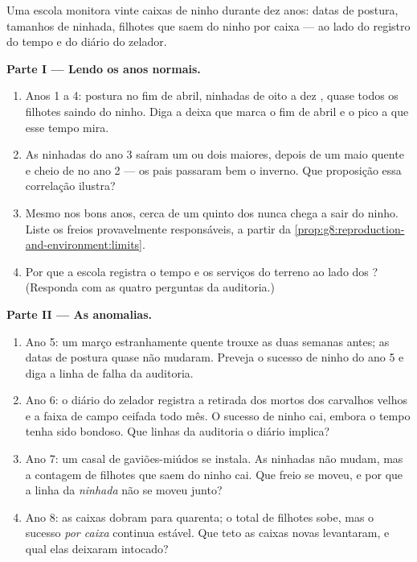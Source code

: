 \begin{problem}\label{pb:g8:reproduction-and-environment:1}
Uma escola monitora vinte caixas de ninho durante dez anos: datas de
postura, tamanhos de ninhada, filhotes que saem do ninho por caixa ---
ao lado do registro do tempo e do diário do zelador.

\medskip\noindent\textbf{Parte I --- Lendo os anos
normais.}
\begin{enumerate}
  \item Anos 1 a 4: postura no fim de abril, ninhadas de oito a dez
        , quase todos os filhotes saindo do ninho. Diga a deixa
        que marca o fim de abril e o pico a que esse tempo mira.
  \item As ninhadas do ano 3 saíram um ou dois  maiores, depois
        de um maio quente e cheio de  no ano 2 --- os pais
        passaram bem o inverno. Que proposição essa correlação
        ilustra?
  \item Mesmo nos bons anos, cerca de um quinto dos  nunca chega
        a sair do ninho. Liste os freios provavelmente responsáveis,
        a partir da
        \cref{prop:g8:reproduction-and-environment:limits}.
  \item Por que a escola registra o tempo e os serviços do terreno ao
        lado dos ? (Responda com as quatro perguntas da
        auditoria.)
\end{enumerate}

\medskip\noindent\textbf{Parte II --- As anomalias.}
\begin{enumerate}[resume]
  \item Ano 5: um março estranhamente quente trouxe as  duas
        semanas antes; as datas de postura quase não mudaram. Preveja
        o sucesso de ninho do ano 5 e diga a linha de falha da
        auditoria.
  \item Ano 6: o diário do zelador registra a retirada dos 
        mortos dos carvalhos velhos e a faixa de campo ceifada todo
        mês. O sucesso de ninho cai, embora o tempo tenha sido
        bondoso. Que linhas da auditoria o diário implica?
  \item Ano 7: um casal de gaviões-miúdos se instala. As ninhadas não
        mudam, mas a contagem de filhotes que saem do ninho cai. Que
        freio se moveu, e por que a linha da \emph{ninhada} não se
        moveu junto?
  \item Ano 8: as caixas dobram para quarenta; o total de filhotes
        sobe, mas o sucesso \emph{por caixa} continua estável. Que
        teto as caixas novas levantaram, e qual elas deixaram
        intocado?
\end{enumerate}


\end{problem}
